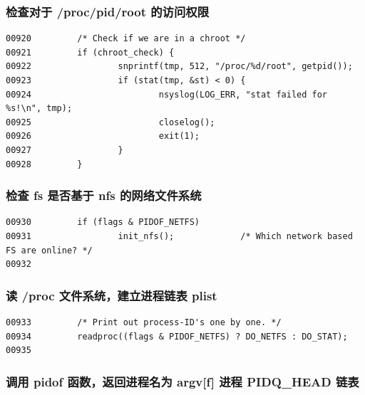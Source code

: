 \subsubsection{检查对于 /proc/pid/root 的访问权限}

{\begin{shaded}\begin{verbatim}
00920         /* Check if we are in a chroot */
00921         if (chroot_check) {
00922                 snprintf(tmp, 512, "/proc/%d/root", getpid());
00923                 if (stat(tmp, &st) < 0) {
00924                         nsyslog(LOG_ERR, "stat failed for %s!\n", tmp);
00925                         closelog();
00926                         exit(1);
00927                 }
00928         }
\end{verbatim}\end{shaded}}
\subsubsection{检查 fs 是否基于 nfs 的网络文件系统}

{\begin{shaded}\begin{verbatim}
00930         if (flags & PIDOF_NETFS)
00931                 init_nfs();             /* Which network based FS are online? */
00932 
\end{verbatim}\end{shaded}}
\subsubsection{读 /proc 文件系统，建立进程链表 plist}

{\begin{shaded}\begin{verbatim}
00933         /* Print out process-ID's one by one. */
00934         readproc((flags & PIDOF_NETFS) ? DO_NETFS : DO_STAT);
00935 
\end{verbatim}\end{shaded}}
\subsubsection{调用 pidof 函数，返回进程名为 argv{[}f{]} 进程 PIDQ\_HEAD
链表}

